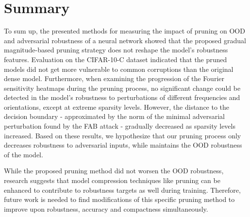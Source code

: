 \section{Summary}

To sum up, the presented methods for measuring the impact of pruning on OOD and adversarial robustness of a neural network
showed that the proposed gradual magnitude-based pruning strategy does not reshape the model's robustness features. Evaluation on the CIFAR-10-C dataset
indicated that the pruned models did not get more vulnerable to common corruptions than the original dense model. Furthermore, when examining the progression
of the Fourier sensitivity heatmaps during the pruning process, no significant change could be detected in the model's robustness to 
perturbations of different frequencies and orientations, except at extreme sparsity levels. However, the distance to the decision boundary
- approximated by the norm of the minimal adversarial perturbation found by the FAB attack - gradually decreased as sparsity levels increased. Based on these
results, we hypothesize that our pruning process only decreases robustness to adversarial inputs, while maintains the OOD robustness of the model.

While the proposed pruning method did not worsen the OOD robustness, research suggests that model compression techniques like pruning
can be enhanced to contribute to robustness targets as well during training. Therefore, future work is needed to find modifications of this specific
pruning method to improve upon robustness, accuracy and compactness simultaneously.   